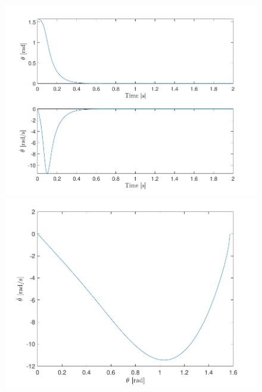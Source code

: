 \documentclass[10pt]{article}
\begin{document}
\begin{figure}[ht]
    \centering
    \begin{minipage}[b]{0.45\textwidth}
        \centering
        \includegraphics[clip,width=1\linewidth]{lab1/figs/section7_controlled_state_evolution_x_0_4.pdf}
    \end{minipage}
    \begin{minipage}[b]{0.45\textwidth}
        \centering
        \includegraphics[clip,width=1\linewidth]{lab1/figs/section7_controlled_state_orbit_x_0_4.pdf}
    \end{minipage}
\end{figure}
\end{document}
